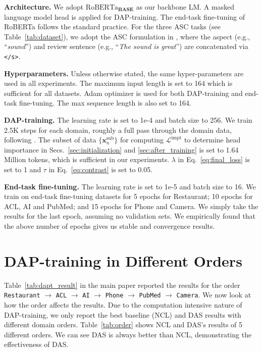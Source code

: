 \documentclass{article} \usepackage{iclr2023_conference,times}
\begin{document}
\textbf{Architecture.} We adopt $\text{RoBERTa}_{\textbf{BASE}}$ as our backbone LM. A masked language model head is applied for DAP-training. The end-task fine-tuning of RoBERTa follows the standard practice. 
For the three ASC tasks (see Table~\ref{tab:dataset}), we adopt the ASC formulation in \cite{DBLP:conf/naacl/XuLSY19}, where the aspect (e.g., ``\textit{sound}'') and review sentence (e.g., ``\textit{The sound is great}'') are concatenated via \texttt{</s>}. 

\textbf{Hyperparameters.} Unless otherwise stated, the same hyper-parameters are used in all experiments. The maximum input length is set to 164 which is sufficient for all datasets. Adam optimizer is used for both DAP-training and end-task fine-tuning. The max sequence length is also set to 164. 

\textbf{DAP-training.} The learning rate is set to 1e-4 and batch size to 256. We train 2.5K steps for each domain, roughly a full pass through the domain data, following \cite{DBLP:conf/acl/GururanganMSLBD20,DBLP:conf/naacl/XuLSY19}. The subset of data $\{\bm{x}^{\text{sub}}_n\}$ for computing $\mathcal{L}^{\text{impt}}$ to determine head importance in Secs.~\ref{sec:initialization} and \ref{sec:after_training} is set to 1.64 Million tokens, which is sufficient in our experiments. $\lambda$ in Eq.~\ref{eq:final_loss} is set to 1 and $\tau$ in Eq.~\ref{eq:contrast} is set to 0.05. 

\textbf{End-task fine-tuning.} The learning rate is set to 1e-5 and batch size to 16. We train on end-task fine-tuning datasets for 5 epochs for Restaurant; 10 epochs for ACL, AI and PubMed; and 15 epochs for Phone and Camera. We simply take the results for the last epoch, assuming no validation sets. We empirically found that the above number of epochs gives us stable and convergence results. 



\section{DAP-training in Different Orders}
\label{ap:order}

Table~\ref{tab:dapt_result} in the main paper reported the results for the order \texttt{Restaurant} $\to$ \texttt{ACL} $\to$ \texttt{AI} $\to$ \texttt{Phone} $\to$ \texttt{PubMed} $\to$ \texttt{Camera}. We now look at how the order affects the results. Due to the computation intensive nature of DAP-training, we only report the best baseline (NCL) and DAS results with different domain orders. Table~\ref{tab:order} shows NCL and DAS's results of 5 different orders. We can see DAS is always better than NCL, demonstrating the effectiveness of DAS.
\end{document}
